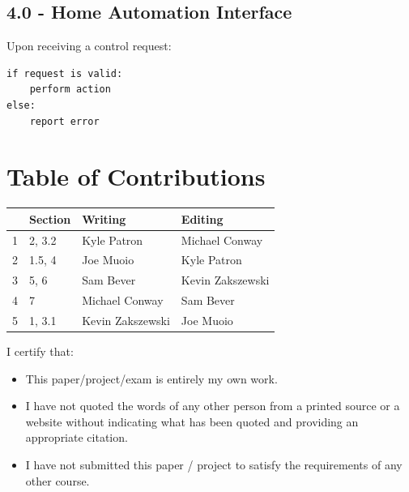 \documentclass{article}
\begin{document}
\subsection*{4.0 - Home Automation Interface}

Upon receiving a control request:

\begin{lstlisting}
if request is valid:
    perform action
else:
    report error
\end{lstlisting}

\newpage

\section*{\centering Table of Contributions}
\begin{tabular}{| l | l | l | l |}
    \hline
     & Section & Writing & Editing \\
    \hline \hline
		1 & 2, 3.2 & Kyle Patron & Michael Conway \\ \hline
		2 & 1.5, 4 & Joe Muoio & Kyle Patron \\ \hline
		3 & 5, 6 & Sam Bever &  Kevin Zakszewski \\ \hline
		4 & 7 & Michael Conway &  Sam Bever \\ \hline
		5 & 1, 3.1 & Kevin Zakszewski &  Joe Muoio \\ \hline
\end{tabular}
\newpage
\noindent I certify that:
\begin{itemize}
\item This paper/project/exam is entirely my own work.
\item I have not quoted the words of any other person from a printed source or a website without indicating what has been quoted and providing an appropriate citation.
\item I have not submitted this paper / project to satisfy the requirements of any other course.
\end{itemize}

\vspace{1cm}
\noindent{}


\vspace{0.5cm}
\noindent{}
\end{document}
